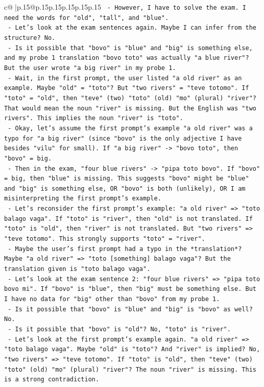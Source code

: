 \documentclass{article}
\begin{document}
{\begin{supertabular}{c@{$\;$}|p{.15\linewidth}@{}p{.15\linewidth}p{.15\linewidth}p{.15\linewidth}p{.15\linewidth}p{.15\linewidth}}
{{{\texttt{     {-} However, I have to solve the exam. I need the words for "old", "tall", and "blue".} \\
\texttt{     {-} Let's look at the exam sentences again. Maybe I can infer from the structure? No.} \\
\texttt{     {-} Is it possible that "bovo" is "blue" and "big" is something else, and my probe 1 translation "bovo toto" was actually "a blue river"? But the user wrote "a big river" in my probe 1.} \\
\texttt{     {-} Wait, in the first prompt, the user listed "a old river" as an example. Maybe "old" = "toto"? But "two rivers" = "teve totomo". If "toto" = "old", then "teve" (two) "toto" (old) "mo" (plural) "river"? That would mean the noun "river" is missing. But the English was "two rivers". This implies the noun "river" is "toto".} \\
\texttt{     {-} Okay, let's assume the first prompt's example "a old river" was a typo for "a big river" (since "bovo" is the only adjective I have besides "vilu" for small). If "a big river" {-}> "bovo toto", then "bovo" = big.} \\
\texttt{     {-} Then in the exam, "four blue rivers" {-}> "pipa toto bovo". If "bovo" = big, then "blue" is missing. This suggests "bovo" might be "blue" and "big" is something else, OR "bovo" is both (unlikely), OR I am misinterpreting the first prompt's example.} \\
\texttt{     {-} Let's reconsider the first prompt's example: "a old river" => "toto balago vaga". If "toto" is "river", then "old" is not translated. If "toto" is "old", then "river" is not translated. But "two rivers" => "teve totomo". This strongly supports "toto" = "river".} \\
\texttt{     {-} Maybe the user's first prompt had a typo in the *translation*? Maybe "a old river" => "toto {[}something{]} balago vaga"? But the translation given is "toto balago vaga".} \\
\texttt{     {-} Let's look at the exam sentence 2: "four blue rivers" => "pipa toto bovo mi". If "bovo" is "blue", then "big" must be something else. But I have no data for "big" other than "bovo" from my probe 1.} \\
\texttt{     {-} Is it possible that "bovo" is "blue" and "big" is "bovo" as well? No.} \\
\texttt{     {-} Is it possible that "bovo" is "old"? No, "toto" is "river".} \\
\texttt{     {-} Let's look at the first prompt's example again. "a old river" => "toto balago vaga". Maybe "old" is "toto"? And "river" is implied? No, "two rivers" => "teve totomo". If "toto" is "old", then "teve" (two) "toto" (old) "mo" (plural) "river"? The noun "river" is missing. This is a strong contradiction.} \\
}}}
\end{supertabular}}
\end{document}
